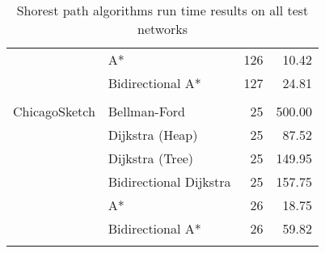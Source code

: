 \begin{table}[H]
{\begin{tabular}{l l r r}
                      & A*                      & 126 & 10.42\\
                      & Bidirectional A*        & 127 & 24.81\\ \\
        ChicagoSketch & Bellman-Ford            & 25 & 500.00\\
                      & Dijkstra (Heap)         & 25 & 87.52\\
                      & Dijkstra (Tree)         & 25 & 149.95\\
                      & Bidirectional Dijkstra  & 25 & 157.75\\
                      & A*                      & 26 & 18.75\\
                      & Bidirectional A*        & 26 & 59.82\\ \\
        \bottomrule
     \end{tabular}
     \caption{Shorest path algorithms run time results on all test networks}
     \label{table:allresults}
}
\end{table}
